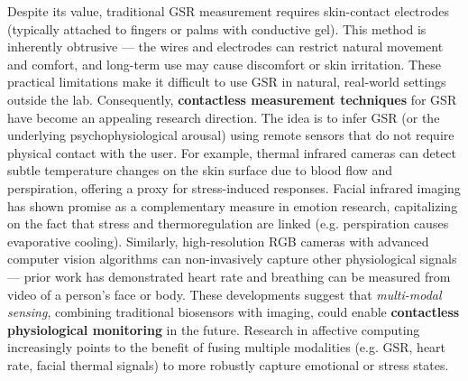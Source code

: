 Despite its value, traditional GSR measurement requires skin-contact
electrodes (typically attached to fingers or palms with conductive
gel)\cite{Fowles1981}.
This method is inherently obtrusive --- the wires and electrodes can
restrict natural movement and comfort, and long-term use may cause
discomfort or skin
irritation\cite{Healey2005}\cite{Picard2001}.
These practical limitations make it difficult to use GSR in natural,
real-world settings outside the lab. Consequently, \textbf{contactless
measurement techniques} for GSR have become an appealing research
direction\cite{DriverStressThermal2020}.
The idea is to infer GSR (or the underlying psychophysiological arousal)
using remote sensors that do not require physical contact with the user.
For example, thermal infrared cameras can detect subtle temperature
changes on the skin surface due to blood flow and perspiration, offering
a proxy for stress-induced
responses\cite{GSRFacialThermal2021}.
Facial infrared imaging has shown promise as a complementary measure in
emotion research, capitalizing on the fact that stress and
thermoregulation are linked (e.g. perspiration causes evaporative
cooling)\cite{StressDefinitionHH}.
Similarly, high-resolution RGB cameras with advanced computer vision
algorithms can non-invasively capture other physiological signals ---
prior work has demonstrated heart rate and breathing can be measured
from video of a person's face or
body\cite{CortisolStressIndicator2020}\cite{WHOStressDefinition}.
These developments suggest that \textit{multi-modal sensing}, combining
traditional biosensors with imaging, could enable \textbf{contactless
physiological monitoring} in the future. Research in affective
computing increasingly points to the benefit of fusing multiple
modalities (e.g. GSR, heart rate, facial thermal signals) to more
robustly capture emotional or stress
states\cite{Boucsein2012}\cite{CortisolStressIndicator2020}.

